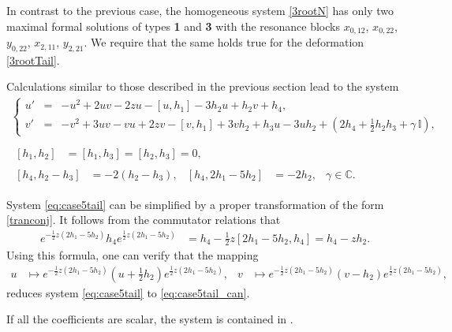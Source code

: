 \documentclass{article}
\theoremstyle{plain}
\newcommand{\brackets}[1]{\left( #1 \right)}
\newcommand{\LieBrackets}[1]{\left[ #1 \right]}
\begin{document}
In contrast to the previous case, the homogeneous system \eqref{3rootN} has only two maximal formal solutions of  types \textbf{1} and \textbf{3} with the resonance blocks $x_{0, 12}$, $x_{0, 22}$, $y_{0, 22}$, $x_{2, 11}$, $y_{2, 21}$. We require that the same holds true for the deformation \eqref{3rootTail}.

Calculations similar to those described in the previous section lead to the system
\begin{gather} 
    \left\{
    \begin{array}{lcl}
    u' 
    &=& - u^2 + 2 u v - 2 z u - \LieBrackets{u, h_1} - 3 h_2 u + h_2 v + h_4,
    \\[2mm]
    v'
    &=& - v^2 + 3 u v - v u + 2 z v - \LieBrackets{v, h_1} + 3 v h_2 + h_3 u - 3 u h_2 + \brackets{2 h_4 + \frac{1}{2} h_2 h_3 + \gamma \, \mathbb{I}},
    \end{array}
    \right.
    \\
    \label{eq:case5tail}
    \\[-3mm]
    \begin{aligned}
    \LieBrackets{h_1, h_2}
    &= \LieBrackets{h_1, h_3}
    = \LieBrackets{h_2, h_3}
    = 0,
    \end{aligned}
    \\[1mm]
    \begin{aligned}
    \LieBrackets{h_4, h_2 - h_3}
    &= - 2 \brackets{h_2 - h_3},
    &
    \LieBrackets{h_4, 2 h_1 - 5 h_2}
    &= - 2 h_2,
    &
    \gamma \in \mathbb{C}.
    \end{aligned}
\end{gather}

System \eqref{eq:case5tail} can be simplified by a proper transformation of the form \eqref{tranconj}. It follows from the commutator relations that 
\begin{align*}
    e^{- \frac12 z (2 h_1 - 5 h_2)} h_4 e^{\frac12 z (2 h_1 - 5 h_2)}
    &= h_4 - \frac12 z [2 h_1 - 5 h_2, h_4]
    = h_4 - z h_2.
\end{align*}Using this formula, one can verify that the mapping
\begin{align*}
    u 
    & \mapsto e^{- \frac12 z (2 h_1 - 5 h_2)} 
    \brackets{u + \frac12 h_2} 
    e^{\frac12 z (2 h_1 - 5 h_2)},
    &
    v 
    & \mapsto e^{- \frac12 z (2 h_1 - 5 h_2)} 
    \brackets{v - h_2} 
    e^{\frac12 z (2 h_1 - 5 h_2)},
\end{align*}
reduces system \eqref{eq:case5tail} to  \ref{eq:case5tail_can}.

If all the coefficients are scalar, the system is contained in \cite[(21)]{adler2020}.
\end{document}
